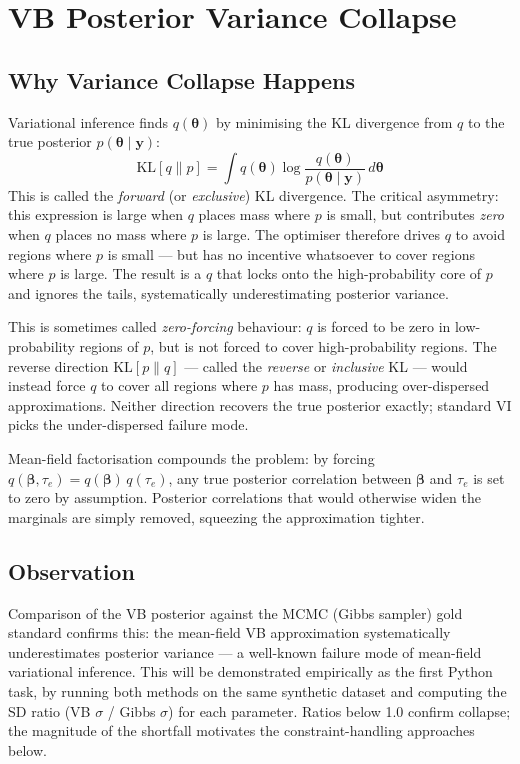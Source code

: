 \documentclass[11pt,a4paper]{article}
\begin{document}
\section{VB Posterior Variance Collapse}
\label{app:vb-collapse}

\subsection*{Why Variance Collapse Happens}

Variational inference finds $q(\bm{\theta})$ by minimising the KL divergence from $q$ to the true posterior $p(\bm{\theta}\mid\bm{y})$:
\begin{equation}
  \mathrm{KL}[q \| p] = \int q(\bm{\theta}) \log \frac{q(\bm{\theta})}{p(\bm{\theta}\mid\bm{y})} \, d\bm{\theta}
\end{equation}
This is called the \emph{forward} (or \emph{exclusive}) KL divergence. The critical asymmetry: this expression is large when $q$ places mass where $p$ is small, but contributes \emph{zero} when $q$ places no mass where $p$ is large. The optimiser therefore drives $q$ to avoid regions where $p$ is small --- but has no incentive whatsoever to cover regions where $p$ is large. The result is a $q$ that locks onto the high-probability core of $p$ and ignores the tails, systematically underestimating posterior variance.

This is sometimes called \emph{zero-forcing} behaviour: $q$ is forced to be zero in low-probability regions of $p$, but is not forced to cover high-probability regions. The reverse direction $\mathrm{KL}[p \| q]$ --- called the \emph{reverse} or \emph{inclusive} KL --- would instead force $q$ to cover all regions where $p$ has mass, producing over-dispersed approximations. Neither direction recovers the true posterior exactly; standard VI picks the under-dispersed failure mode.

Mean-field factorisation compounds the problem: by forcing $q(\bm{\beta}, \tau_e) = q(\bm{\beta})\,q(\tau_e)$, any true posterior correlation between $\bm{\beta}$ and $\tau_e$ is set to zero by assumption. Posterior correlations that would otherwise widen the marginals are simply removed, squeezing the approximation tighter.

\subsection*{Observation}

Comparison of the VB posterior against the MCMC (Gibbs sampler) gold standard confirms this: the mean-field VB approximation systematically underestimates posterior variance --- a well-known failure mode of mean-field variational inference. This will be demonstrated empirically as the first Python task, by running both methods on the same synthetic dataset and computing the SD ratio (VB $\sigma$ / Gibbs $\sigma$) for each parameter. Ratios below 1.0 confirm collapse; the magnitude of the shortfall motivates the constraint-handling approaches below.
\end{document}
